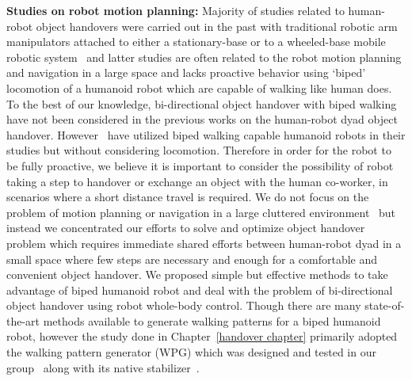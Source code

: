 \textbf{Studies on robot motion planning:} Majority of studies related to human-robot object handovers were carried out in the past with traditional robotic arm manipulators attached to either a stationary-base or to a wheeled-base mobile robotic system~\cite{medina2016human, vogt2018one, huber2008Indus, kupcsik2016learning, cakmak2011human} and latter studies are often related to the robot motion planning and navigation in a large space and lacks proactive behavior using `biped' locomotion of a humanoid robot which are capable of walking like human does. To the best of our knowledge, bi-directional object handover with biped walking have not been considered in the previous works on the human-robot dyad object handover. However~\cite{vezzani2017novel, chan2014implementation} have utilized biped walking capable humanoid robots in their studies but without considering locomotion. Therefore in order for the robot to be fully proactive, we believe it is important to consider the possibility of robot taking a step to handover or exchange an object with the human co-worker, in scenarios where a short distance travel is required. We do not focus on the problem of motion planning or navigation in a large cluttered environment~\cite{mainprice2012sharing, vahrenkamp2009humanoid, kim2004advanced} but instead we concentrated our efforts to solve and optimize object handover problem which requires immediate shared efforts between human-robot dyad in a small space where few steps are necessary and enough for a comfortable and convenient object handover. We proposed simple but effective methods to take advantage of biped humanoid robot and deal with the problem of bi-directional object handover using robot whole-body control. Though there are many state-of-the-art methods available to generate walking patterns for a biped humanoid robot, however the study done in Chapter~\ref{handover chapter} primarily adopted the walking pattern generator (WPG) which was designed and tested in our group~\cite{ kajita20013d, caron2016humanoids} along with its native stabilizer~\cite{kajita2010biped, caron2018stair}.






